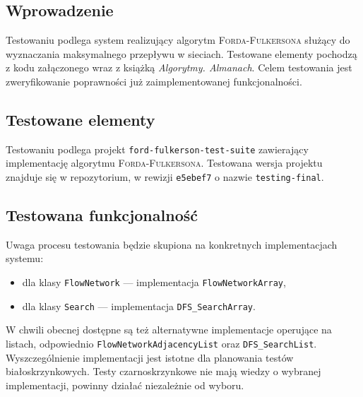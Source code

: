 \subsection{Wprowadzenie}
Testowaniu podlega system realizujący algorytm \textsc{Forda-Fulkersona} służący
do wyznaczania maksymalnego przepływu w sieciach. Testowane elementy pochodzą z
kodu załączonego wraz z książką \emph{Algorytmy. Almanach}. Celem testowania
jest zweryfikowanie poprawności już zaimplementowanej funkcjonalności.

\subsection{Testowane elementy}
Testowaniu podlega projekt \texttt{ford-fulkerson-test-suite} zawierający
implementację algorytmu \textsc{Forda-Fulkersona}. Testowana wersja projektu
znajduje się w repozytorium, w rewizji \texttt{e5ebef7} o nazwie \texttt
{testing-final}.

\subsection{Testowana funkcjonalność}
Uwaga procesu testowania będzie skupiona na konkretnych implementacjach systemu:
\begin{itemize}
    \item dla klasy \texttt{FlowNetwork} --- implementacja
        \texttt{FlowNetworkArray},
    \item dla klasy \texttt{Search} --- implementacja \texttt{DFS\_SearchArray}.
\end{itemize}
W chwili obecnej dostępne są też alternatywne implementacje operujące na
listach, odpowiednio \texttt{FlowNetworkAdjacencyList} oraz
\texttt{DFS\_SearchList}. Wyszczególnienie implementacji jest istotne dla
planowania testów biało\dywiz skrzynkowych. Testy czarno\dywiz skrzynkowe
nie mają wiedzy o wybranej implementacji, powinny działać niezależnie od wyboru.

